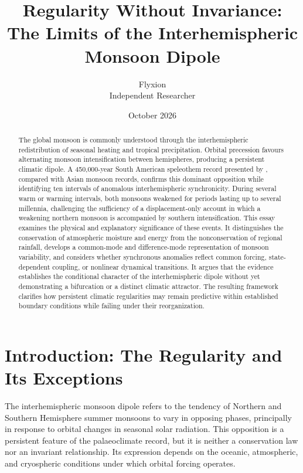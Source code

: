 \documentclass[11pt]{article}
\title{Regularity Without Invariance:\\The Limits of the Interhemispheric Monsoon Dipole}
\author{Flyxion\\Independent Researcher}
\date{October 2026}
\theoremstyle{definition}
\begin{document}
\maketitle

\begin{abstract}
\noindent
The global monsoon is commonly understood through the interhemispheric redistribution of seasonal heating and tropical precipitation. Orbital precession favours alternating monsoon intensification between hemispheres, producing a persistent climatic dipole. A 450,000-year South American speleothem record presented by \citet{olson2026}, compared with Asian monsoon records, confirms this dominant opposition while identifying ten intervals of anomalous interhemispheric synchronicity. During several warm or warming intervals, both monsoons weakened for periods lasting up to several millennia, challenging the sufficiency of a displacement-only account in which a weakening northern monsoon is accompanied by southern intensification. This essay examines the physical and explanatory significance of these events. It distinguishes the conservation of atmospheric moisture and energy from the nonconservation of regional rainfall, develops a common-mode and difference-mode representation of monsoon variability, and considers whether synchronous anomalies reflect common forcing, state-dependent coupling, or nonlinear dynamical transitions. It argues that the evidence establishes the conditional character of the interhemispheric dipole without yet demonstrating a bifurcation or a distinct climatic attractor. The resulting framework clarifies how persistent climatic regularities may remain predictive within established boundary conditions while failing under their reorganization.
\end{abstract}

\section{Introduction: The Regularity and Its Exceptions}

The interhemispheric monsoon dipole refers to the tendency of Northern and Southern Hemisphere summer monsoons to vary in opposing phases, principally in response to orbital changes in seasonal solar radiation. This opposition is a persistent feature of the palaeoclimate record, but it is neither a conservation law nor an invariant relationship. Its expression depends on the oceanic, atmospheric, and cryospheric conditions under which orbital forcing operates.
\end{document}
